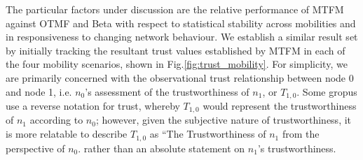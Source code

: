 \documentclass[runningheads,a4paper]{llncs}
\begin{document}
The particular factors under discussion are the relative performance of MTFM against OTMF and Beta with respect to statistical stability across mobilities and in responsiveness to changing network behaviour. 
We establish a similar result set by initially tracking the resultant trust values established by MTFM in each of the four mobility scenarios, shown in Fig.\ref{fig:trust_mobility}.
For simplicity, we are primarily concerned with the observational trust relationship between node 0 and node 1, i.e. $n_0$'s assessment of the trustworthiness of $n_1$, or $T_{1,0}$.
Some gropus use a reverse notation for trust, whereby $T_{1,0}$ would represent the trustworthiness of $n_1$ according to $n_0$; however, given the subjective nature of trustworthiness, it is more relatable to describe $T_{1,0}$ as ``The Trustworthiness of $n_1$ from the perspective of $n_0$. rather than an absolute statement on $n_1$'s trustworthiness.
\end{document}
